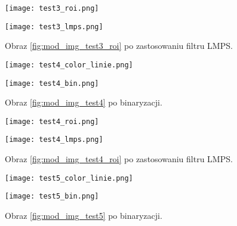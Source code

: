 \begin{figure}
	\begin{minipage}{0.48\textwidth}
		\centering
		\texttt{[image: test3\_roi.png]}
		\caption{Obraz \ref{fig:mod_img_test3_bin} po wyznaczeniu ROI.}
		\label{fig:mod_img_test3_roi}
	\end{minipage}
	\begin{minipage}{0.48\textwidth}
		\centering
		\texttt{[image: test3\_lmps.png]}
		\caption{Obraz \ref{fig:mod_img_test3_roi} po zastosowaniu filtru LMPS.}
		\label{fig:mod_img_test3_lmps}
	\end{minipage}
\end{figure}



\begin{figure}
	\begin{minipage}{0.48\textwidth}
		\centering
		\texttt{[image: test4\_color\_linie.png]}
		\caption{Obraz prostej drogi z refleksami wraz z naniesionymi środkami ciężkości oraz wykrytymi liniami.}
		\label{fig:mod_img_test4}
	\end{minipage}
	\begin{minipage}{0.48\textwidth}
		\centering
		\texttt{[image: test4\_bin.png]}
		\caption{Obraz \ref{fig:mod_img_test4} po binaryzacji.}
		\label{fig:mod_img_test4_bin}
	\end{minipage}
\end{figure}

\begin{figure}
	\begin{minipage}{0.48\textwidth}
		\centering
		\texttt{[image: test4\_roi.png]}
		\caption{Obraz \ref{fig:mod_img_test4_bin} po wyznaczeniu ROI.}
		\label{fig:mod_img_test4_roi}
	\end{minipage}
	\begin{minipage}{0.48\textwidth}
		\centering
		\texttt{[image: test4\_lmps.png]}
		\caption{Obraz \ref{fig:mod_img_test4_roi} po zastosowaniu filtru LMPS.}
		\label{fig:mod_img_test4_lmps}
	\end{minipage}
\end{figure}



\begin{figure}
	\begin{minipage}{0.48\textwidth}
		\centering
		\texttt{[image: test5\_color\_linie.png]}
		\caption{Obraz prostej drogi z mocno zacienionym pasem ruchu, wraz z naniesionymi środkami ciężkości oraz wykrytymi liniami.}
		\label{fig:mod_img_test5}
	\end{minipage}
	\begin{minipage}{0.48\textwidth}
		\centering
		\texttt{[image: test5\_bin.png]}
		\caption{Obraz \ref{fig:mod_img_test5} po binaryzacji.}
		\label{fig:mod_img_test5_bin}
	\end{minipage}
\end{figure}


